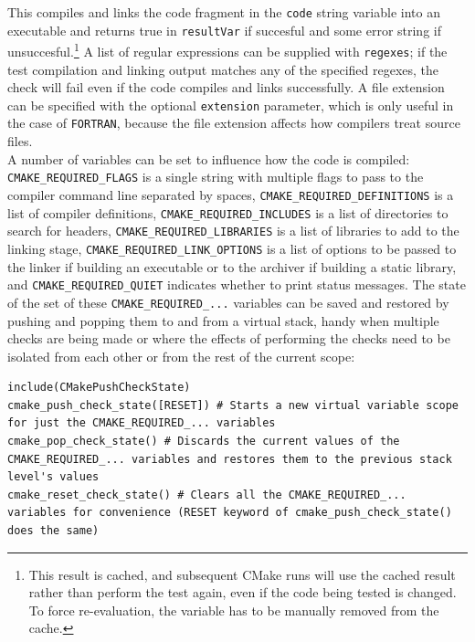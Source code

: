 \documentclass[table, xcdraw]{article}%
\begin{document}
This compiles and links the code fragment in the \texttt{code} string variable into an executable and returns true in \texttt{resultVar} if succesful and some error string if unsuccesful.\footnote{This result is cached, and subsequent CMake runs will use the cached result rather than perform the test again, even if the code being tested is changed. To force re-evaluation, the variable has to be manually removed from the cache.} A list of regular expressions can be supplied with \texttt{regexes}; if the test compilation and linking output matches any of the specified regexes, the check will fail even if the code compiles and links successfully. A file extension can be specified with the optional \texttt{extension} parameter, which is only useful in the case of \texttt{FORTRAN}, because the file extension affects how compilers treat source files.\\
A number of variables can be set to influence how the code is compiled: \texttt{CMAKE_REQUIRED_FLAGS} is a single string with multiple flags to pass to the compiler command line separated by spaces, \texttt{CMAKE_REQUIRED_DEFINITIONS} is a list of compiler definitions, \texttt{CMAKE_REQUIRED_INCLUDES} is a list of directories to search for headers, \texttt{CMAKE_REQUIRED_LIBRARIES} is a list of libraries to add to the linking stage, \texttt{CMAKE_REQUIRED_LINK_OPTIONS} is a list of options to be passed to the linker if building an executable or to the archiver if
building a static library, and \texttt{CMAKE_REQUIRED_QUIET} indicates whether to print status messages. The state of the set of these \texttt{CMAKE_REQUIRED_...} variables can be saved and restored by pushing and popping them to and from a virtual stack, handy when multiple checks are being made or where the effects of performing the checks need to be isolated from each other or from the rest of the current scope:

\begin{verbatim}
include(CMakePushCheckState)
cmake_push_check_state([RESET]) # Starts a new virtual variable scope for just the CMAKE_REQUIRED_... variables
cmake_pop_check_state() # Discards the current values of the CMAKE_REQUIRED_... variables and restores them to the previous stack level's values
cmake_reset_check_state() # Clears all the CMAKE_REQUIRED_... variables for convenience (RESET keyword of cmake_push_check_state() does the same)
\end{verbatim}
\end{document}
